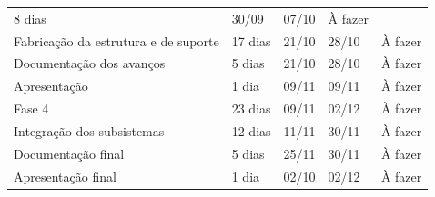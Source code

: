 \begin{table}[H]
{\begin{tabular}{ l l l l l }
    \multicolumn{1}{p{1.700cm}|}{8 dias \centering } &
    \multicolumn{1}{p{1.133cm}|}{30/09 \centering } &
    \multicolumn{1}{p{0.967cm}|}{07/10 \centering } &
    \multicolumn{1}{p{1.833cm}|}{À fazer \centering }
  \\  
  \cline{1-1}\cline{2-2}\cline{3-3}\cline{4-4}\cline{5-5}  
    \multicolumn{1}{|p{3.867cm}|}{Fabricação da estrutura e de suporte} &
    \multicolumn{1}{p{1.700cm}|}{17 dias \centering } &
    \multicolumn{1}{p{1.133cm}|}{21/10 \centering } &
    \multicolumn{1}{p{0.967cm}|}{28/10 \centering } &
    \multicolumn{1}{p{1.833cm}|}{À fazer \centering }
  \\  
  \cline{1-1}\cline{2-2}\cline{3-3}\cline{4-4}\cline{5-5}  
    \multicolumn{1}{|p{3.867cm}|}{Documentação dos avanços} &
    \multicolumn{1}{p{1.700cm}|}{5 dias \centering } &
    \multicolumn{1}{p{1.133cm}|}{21/10 \centering } &
    \multicolumn{1}{p{0.967cm}|}{28/10 \centering } &
    \multicolumn{1}{p{1.833cm}|}{À fazer \centering }
  \\  
  \cline{1-1}\cline{2-2}\cline{3-3}\cline{4-4}\cline{5-5}  
    \multicolumn{1}{|p{3.867cm}|}{Apresentação} &
    \multicolumn{1}{p{1.700cm}|}{1 dia \centering } &
    \multicolumn{1}{p{1.133cm}|}{09/11 \centering } &
    \multicolumn{1}{p{0.967cm}|}{09/11 \centering } &
    \multicolumn{1}{p{1.833cm}|}{À fazer \centering }
  \\  
  \cline{1-1}\cline{2-2}\cline{3-3}\cline{4-4}\cline{5-5}  
    \multicolumn{1}{|p{3.867cm}|}{Fase 4} &
    \multicolumn{1}{p{1.700cm}|}{23 dias \centering } &
    \multicolumn{1}{p{1.133cm}|}{09/11 \centering } &
    \multicolumn{1}{p{0.967cm}|}{02/12 \centering } &
    \multicolumn{1}{p{1.833cm}|}{À fazer \centering }
  \\  
  \cline{1-1}\cline{2-2}\cline{3-3}\cline{4-4}\cline{5-5}  
    \multicolumn{1}{|p{3.867cm}|}{Integração dos subsistemas} &
    \multicolumn{1}{p{1.700cm}|}{12 dias \centering } &
    \multicolumn{1}{p{1.133cm}|}{11/11 \centering } &
    \multicolumn{1}{p{0.967cm}|}{30/11 \centering } &
    \multicolumn{1}{p{1.833cm}|}{À fazer \centering }
  \\  
  \cline{1-1}\cline{2-2}\cline{3-3}\cline{4-4}\cline{5-5}  
    \multicolumn{1}{|p{3.867cm}|}{Documentação final} &
    \multicolumn{1}{p{1.700cm}|}{5 dias \centering } &
    \multicolumn{1}{p{1.133cm}|}{25/11 \centering } &
    \multicolumn{1}{p{0.967cm}|}{30/11 \centering } &
    \multicolumn{1}{p{1.833cm}|}{À fazer \centering }
  \\  
  \cline{1-1}\cline{2-2}\cline{3-3}\cline{4-4}\cline{5-5}  
    \multicolumn{1}{|p{3.867cm}|}{Apresentação final} &
    \multicolumn{1}{p{1.700cm}|}{1 dia \centering } &
    \multicolumn{1}{p{1.133cm}|}{02/10 \centering } &
    \multicolumn{1}{p{0.967cm}|}{02/12 \centering } &
    \multicolumn{1}{p{1.833cm}|}{À fazer \centering }
  \\  
  \hline

 \end{tabular} }
\end{table}



